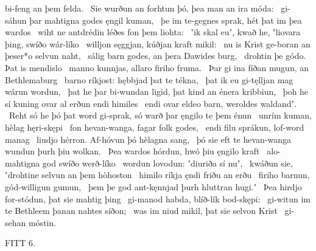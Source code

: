 bi-feng an þem felda. \hld\ Sie wurðun an forhtun þó,
þea man an ira móda: \hld\ gi-sáhun þar mahtigna
godes ęngil kuman, \hld\ þe im te-gegnes sprak,
hét þat im þea wardos \hld\ wiht ne antdrédin
léðes fon þem liohta: \hld\ ʽik skal euʼ, kwað he, ʽliovara þing,
swíðo wár-líko \hld\ willjon sęggjan,
kúðjan kraft mikil: \hld\ nu is Krist ge-boran
an þeser*o selvun naht, \hld\ sálig barn godes,
an þera Dawides burg, \hld\ drohtin þe gódo.
Þat is mendislo \hld\ manno kunnjas,
allaro firiho fruma. \hld\ Þar gi ina fíðan mugun,
an Bethlemaburg \hld\ barno ríkjost:
hębbjad þat te tékna, \hld\ þat ik eu gi-tęlljan mag
wárun wordun, \hld\ þat he þar bi-wundan ligid,
þat kind an énera kribbiun, \hld\ þoh he sí kuning ovar al
erðun endi himiles \hld\ endi ovar eldeo barn,
weroldes waldandʼ. \hld\ Reht só he þó þat word gi-sprak,
só warð þar ęngilo te þem énun \hld\ unrím kuman,
hèlag hęri-skępi \hld\ fon hevan-wanga,
fagar folk godes, \hld\ endi filu sprákun,
lof-word manag \hld\ liudjo hérron.
Af-hóvun þó hèlagna sang, \hld\ þó sie eft te hevan-wanga
wundun þurh þiu wolkan. \hld\ Þea wardos hórdun,
hwó þiu ęngilo kraft \hld\ alo-mahtigna god
swíðo werð-líko \hld\ wordun lovodun:
ʽdiuriða sí nuʼ, \hld\ kwáðun sie, ʽdrohtine selvun
an þem hòhoston \hld\ himilo ríkja
ęndi friðu an erðu \hld\ firiho barnun,
gód-willigun gumun, \hld\ þem þe god ant-kęnnjad
þurh hluttran hugi.ʼ \hld\ Þea hirdjo for-stódun,
þat sie mahtig þing \hld\ gi-manod habda,
blíð-lík bod-skępi: \hld\ gi-witun im te Bethleem þanan
nahtes síðon; \hld\ was im niud mikil,
þat sie selvon Krist \hld\ gi-sehan móstin.

FITT 6.

